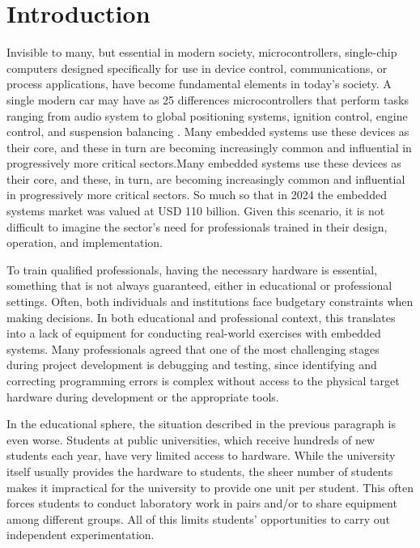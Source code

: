 \chapter{Introduction}
\label{chap:Intro}

Invisible to many, but essential in modern society, microcontrollers, single-chip 
computers designed specifically for use in device control, communications, or process 
applications, have become fundamental elements in today's society. A single modern 
car may have as 25 differences microcontrollers that perform tasks ranging from 
audio system to global positioning systems, ignition control, engine control, and 
suspension balancing \cite{EncyclopediaEmulation}. Many embedded systems use these devices as their core, 
and these in turn are becoming increasingly common and influential in progressively 
more critical sectors.Many embedded systems use these devices as their core, and 
these, in turn, are becoming increasingly common and influential in progressively 
more critical sectors. So much so that in 2024 the embedded systems market was 
valued at USD 110 billion\cite{GMIEmbeddedMarket2026}. Given this scenario, it is not difficult to imagine the 
sector's need for professionals trained in their design, operation, and implementation.

To train qualified professionals, having the necessary hardware is essential, something 
that is not always guaranteed, either in educational or professional settings. 
Often, both individuals and institutions face budgetary constraints when making 
decisions. In both educational and professional context, this translates into a lack 
of equipment for conducting real-world exercises with embedded systems. Many 
professionals agreed that one of the most challenging stages during project development 
is debugging and testing, since identifying and correcting programming errors 
is complex without access to the physical target hardware during development or 
the appropriate tools\cite{EmbeddedMarketStudy2023}\cite{CodeThinkQemu2024}.

In the educational sphere, the situation described in the previous paragraph is 
even worse. Students at public universities, which receive hundreds of new students 
each year, have very limited access to hardware. While the university itself usually 
provides the hardware to students, the sheer number of students makes it impractical 
for the university to provide one unit per student. This often forces students to 
conduct laboratory work in pairs and/or to share equipment among different groups. 
All of this limits students' opportunities to carry out independent experimentation.

